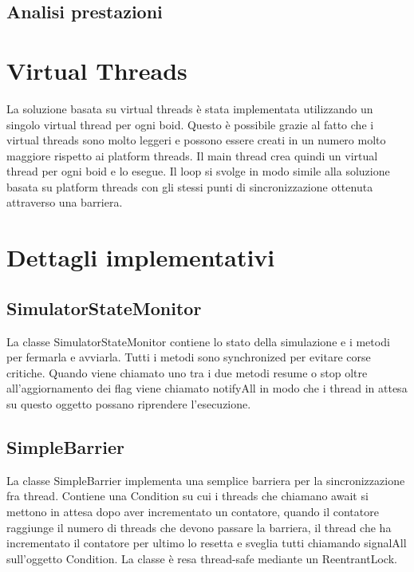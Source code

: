 \documentclass[11pt,notitlepage]{article}
\begin{document}
\subsection{Analisi prestazioni}

\section{Virtual Threads}
La soluzione basata su virtual threads è stata implementata utilizzando un singolo virtual thread per ogni boid. Questo è possibile
grazie al fatto che i virtual threads sono molto leggeri e possono essere creati in un numero molto maggiore rispetto ai platform threads.
Il main thread crea quindi un virtual thread per ogni boid e lo esegue. Il loop si svolge in modo simile alla soluzione basata su platform threads con gli stessi punti
di sincronizzazione ottenuta attraverso una barriera.

\section{Dettagli implementativi}
\subsection{SimulatorStateMonitor}
La classe \textsf{SimulatorStateMonitor} contiene lo stato della simulazione e i metodi per fermarla e avviarla. Tutti i metodi sono \textsf{synchronized} per evitare
corse critiche. Quando viene chiamato uno tra i due metodi \textsf{resume} o \textsf{stop} oltre all'aggiornamento dei flag viene chiamato \textsf{notifyAll} in modo
che i thread in attesa su questo oggetto possano riprendere l'esecuzione.

\subsection{SimpleBarrier}
La classe \textsf{SimpleBarrier} implementa una semplice barriera per la sincronizzazione fra thread. Contiene una \textsf{Condition} su cui i threads che chiamano
\textsf{await} si mettono in attesa dopo aver incrementato un contatore, quando il contatore raggiunge il numero di threads che devono passare la barriera, il 
thread che ha incrementato il contatore per ultimo lo resetta e sveglia tutti chiamando \textsf{signalAll} sull'oggetto \textsf{Condition}.
La classe è resa thread-safe mediante un \textsf{ReentrantLock}.
\end{document}
